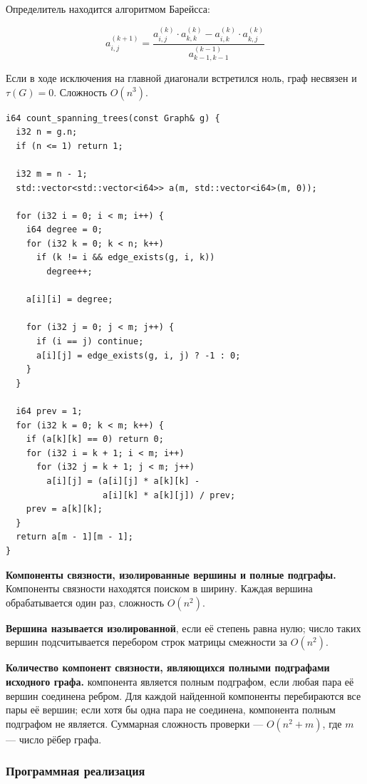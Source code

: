 \documentclass[14pt]{extarticle}
\begin{document}
Определитель находится алгоритмом Барейсса:

$$a_{i,j}^{(k+1)} = \frac{a_{i,j}^{(k)} \cdot a_{k,k}^{(k)} - a_{i,k}^{(k)} \cdot a_{k,j}^{(k)}}{a_{k-1,k-1}^{(k-1)}}$$

Если в ходе исключения на главной диагонали встретился ноль, граф несвязен и \(\tau(G) = 0\). Сложность \(O(n^3)\).

\begin{listing}[htbp]
\caption{Подсчёт остовных деревьев методом Барейсса}
\begin{verbatim}
i64 count_spanning_trees(const Graph& g) {
  i32 n = g.n;
  if (n <= 1) return 1;

  i32 m = n - 1;
  std::vector<std::vector<i64>> a(m, std::vector<i64>(m, 0));

  for (i32 i = 0; i < m; i++) {
    i64 degree = 0;
    for (i32 k = 0; k < n; k++)
      if (k != i && edge_exists(g, i, k))
        degree++;

    a[i][i] = degree;

    for (i32 j = 0; j < m; j++) {
      if (i == j) continue;
      a[i][j] = edge_exists(g, i, j) ? -1 : 0;
    }
  }

  i64 prev = 1;
  for (i32 k = 0; k < m; k++) {
    if (a[k][k] == 0) return 0;
    for (i32 i = k + 1; i < m; i++)
      for (i32 j = k + 1; j < m; j++)
        a[i][j] = (a[i][j] * a[k][k] -
                   a[i][k] * a[k][j]) / prev;
    prev = a[k][k];
  }
  return a[m - 1][m - 1];
}
\end{verbatim}
\end{listing}

\textbf{Компоненты связности, изолированные вершины и полные подграфы.} Компоненты связности находятся поиском в ширину. Каждая вершина обрабатывается один раз, сложность \(O(n^2)\).

\textbf{Вершина называется изолированной}, если её степень равна нулю; число таких вершин подсчитывается перебором строк матрицы смежности за \(O(n^2)\).

\textbf{Количество компонент связности, являющихся полными подграфами исходного графа.} компонента является полным подграфом, если любая пара её вершин соединена ребром. Для каждой найденной компоненты перебираются все пары её вершин; если хотя бы одна пара не соединена, компонента полным подграфом не является. Суммарная сложность проверки --- \(O(n^2 + m)\), где \(m\) --- число рёбер графа.
\subsubsection{Программная реализация}
\label{sec:org684fa2f}
\end{document}
